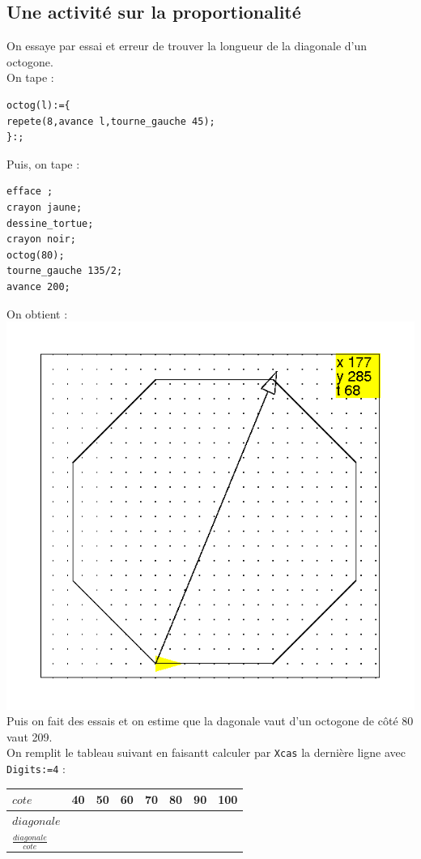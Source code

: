 \documentclass[a4paper,11pt]{book}
\begin{document}
\subsection{Une activit\'e sur la proportionalit\'e}
On essaye par essai et erreur de trouver la longueur de la diagonale d'un
octogone.\\
On tape :
\begin{verbatim}
octog(l):={
repete(8,avance l,tourne_gauche 45);
}:;
\end{verbatim}
Puis, on tape :
\begin{verbatim}
efface ;
crayon jaune;
dessine_tortue;
crayon noir;
octog(80);
tourne_gauche 135/2;
avance 200;
\end{verbatim}
On obtient :\\
\includegraphics[width=\textwidth]{tortoctog}\\
Puis on fait des essais et on estime que la dagonale vaut d'un octogone de 
c\^ot\'e 80 vaut 209.\\
On remplit le tableau suivant en faisantt calculer par {\tt Xcas} la derni\`ere
ligne avec {\tt Digits:=4} :\\
\begin{tabular}{|l|r|r|r|r|r|r|r|}
\hline
$cote$&40&50&60&70&80&90&100\\
\hline
$diagonale$&&&&&&&\\
\hline
$\frac{diagonale}{cote}$& & & & & & & \\
\hline
\end{tabular}
\end{document}
